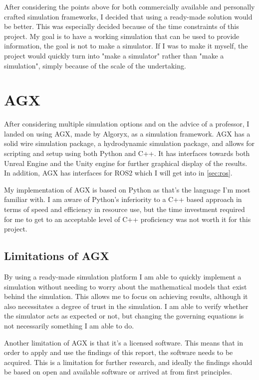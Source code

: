 After considering the points above for both commercially available and personally crafted simulation frameworks, I decided that using a ready-made solution would be better. This was especially decided because of the time constraints of this project. My goal is to have a working simulation that can be used to provide information, the goal is not to make a simulator. If I was to make it myself, the project would quickly turn into "make a simulator" rather than "make a simulation", simply because of the scale of the undertaking. 

\section{AGX}
After considering multiple simulation options and on the advice of a professor, I landed on using AGX, made by Algoryx, as a simulation framework. AGX has a solid wire simulation package, a hydrodynamic simulation package, and allows for scripting and setup using both Python and C++. It has interfaces towards both Unreal Engine and the Unity engine for further graphical display of the results. In addition, AGX has interfaces for ROS2 which I will get into in \cref{sec:ros}. 

My implementation of AGX is based on Python as that's the language I'm most familiar with. I am aware of Python's inferiority to a C++ based approach in terms of speed and efficiency in resource use, but the time investment required for me to get to an acceptable level of C++ proficiency was not worth it for this project.



\subsection{Limitations of AGX}
By using a ready-made simulation platform I am able to quickly implement a simulation without needing to worry about the mathematical models that exist behind the simulation. This allows me to focus on achieving results, although it also necessitates a degree of trust in the simulation. I am able to verify whether the simulator acts as expected or not, but changing the governing equations is not necessarily something I am able to do. 

Another limitation of AGX is that it's a licensed software. This means that in order to apply and use the findings of this report, the software needs to be acquired. This is a limitation for further research, and ideally the findings should be based on open and available software or arrived at from first principles. 


